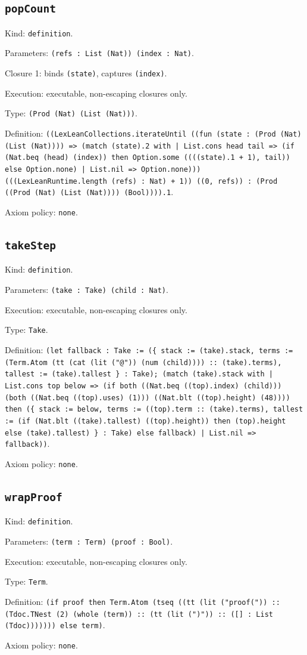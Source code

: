 \documentclass[11pt]{article}
\begin{document}
\subsection*{\texttt{popCount}}
\noindent Kind: \texttt{definition}.\par
\noindent Parameters: \texttt{(refs : List (Nat)) (index : Nat)}.\par
\noindent Closure 1: binds \texttt{(state)}, captures \texttt{(index)}.\par
\noindent Execution: executable, non-escaping closures only.\par
\noindent Type: \texttt{(Prod (Nat) (List (Nat)))}.\par
\noindent Definition: \texttt{((LexLeanCollections.iterateUntil ((fun (state : (Prod (Nat) (List (Nat)))) => (match (state).2 with | List.cons head tail => (if (Nat.beq (head) (index)) then Option.some ((((state).1 + 1), tail)) else Option.none) | List.nil => Option.none))) (((LexLeanRuntime.length (refs) : Nat) + 1)) ((0, refs)) : (Prod ((Prod (Nat) (List (Nat)))) (Bool)))).1}.\par
\noindent Axiom policy: \texttt{none}.\par
\subsection*{\texttt{takeStep}}
\noindent Kind: \texttt{definition}.\par
\noindent Parameters: \texttt{(take : Take) (child : Nat)}.\par
\noindent Execution: executable, non-escaping closures only.\par
\noindent Type: \texttt{Take}.\par
\noindent Definition: \texttt{(let fallback : Take := (\{ stack := (take).stack, terms := (Term.Atom (tt (cat (lit ("@")) (num (child)))) :: (take).terms), tallest := (take).tallest \} : Take); (match (take).stack with | List.cons top below => (if both ((Nat.beq ((top).index) (child))) (both ((Nat.beq ((top).uses) (1))) ((Nat.blt ((top).height) (48)))) then (\{ stack := below, terms := ((top).term :: (take).terms), tallest := (if (Nat.blt ((take).tallest) ((top).height)) then (top).height else (take).tallest) \} : Take) else fallback) | List.nil => fallback))}.\par
\noindent Axiom policy: \texttt{none}.\par
\subsection*{\texttt{wrapProof}}
\noindent Kind: \texttt{definition}.\par
\noindent Parameters: \texttt{(term : Term) (proof : Bool)}.\par
\noindent Execution: executable, non-escaping closures only.\par
\noindent Type: \texttt{Term}.\par
\noindent Definition: \texttt{(if proof then Term.Atom (tseq ((tt (lit ("proof(")) :: (Tdoc.TNest (2) (whole (term)) :: (tt (lit (")")) :: ([] : List (Tdoc))))))) else term)}.\par
\noindent Axiom policy: \texttt{none}.\par
\end{document}

